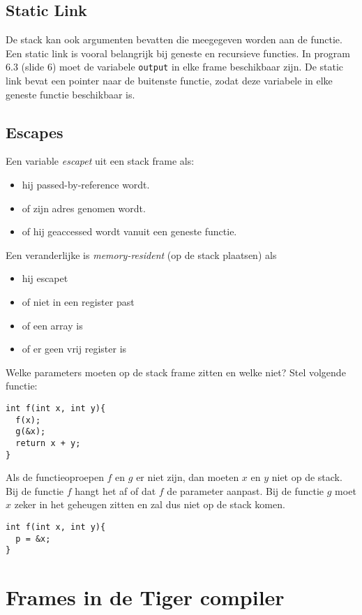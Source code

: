 \subsection{Static Link}

De stack kan ook argumenten bevatten die meegegeven worden aan de functie. Een static link is vooral belangrijk bij geneste en recursieve functies. In program 6.3 (slide 6) moet de variabele \texttt{output} in elke frame beschikbaar zijn. De static link bevat een pointer naar de buitenste functie, zodat deze variabele in elke geneste functie beschikbaar is.



\subsection{Escapes}
Een variable \textit{escapet} uit een stack frame als:
\begin{itemize}
	\item hij passed-by-reference wordt.
	\item of zijn adres genomen wordt.
	\item of hij geaccessed wordt vanuit een geneste functie.
\end{itemize}

Een veranderlijke is \textit{memory-resident} (op de stack plaatsen) als
\begin{itemize}
	\item hij escapet
	\item of niet in een register past
	\item of een array is
	\item of er geen vrij register is
\end{itemize}

Welke parameters moeten op de stack frame zitten en welke niet? Stel volgende functie:
\begin{lstlisting}
int f(int x, int y){
  f(x);
  g(&x);
  return x + y;
}
\end{lstlisting}
Als de functieoproepen $f$ en $g$ er niet zijn, dan moeten $x$ en $y$ niet op de stack. Bij de functie $f$ hangt het af of dat $f$ de parameter aanpast. Bij de functie $g$ moet $x$ zeker in het geheugen zitten en zal dus niet op de stack komen.
\begin{lstlisting}
int f(int x, int y){
  p = &x;
}
\end{lstlisting}


\section{Frames in de Tiger compiler}
